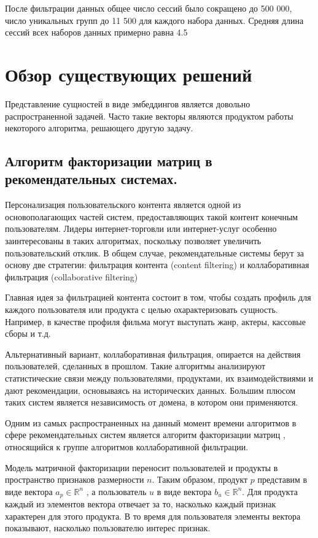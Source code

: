 \documentclass[times,specification,annotation]{itmo-student-thesis}
\begin{document}
После фильтрации данных общее число сессий было сокращено до 500 000, число уникальных групп до 11 500 для каждого набора данных. Средняя длина сессий всех наборов данных примерно равна 4.5

\section{Обзор существующих решений}

Представление сущностей в виде эмбеддингов является довольно распространенной задачей. Часто такие векторы являются продуктом работы некоторого алгоритма, решающего другую задачу. 

\subsection{Алгоритм факторизации матриц в рекомендательных системах.}\label{sec:als}

Персонализация пользовательского контента является одной из основополагающих частей систем, предоставляющих такой контент конечным пользователям. Лидеры интернет-торговли или интернет-услуг особенно заинтересованы в таких алгоритмах, поскольку позволяет увеличить пользовательский отклик.
В общем случае, рекомендательные системы берут за основу две стратегии: фильтрация контента (content filtering) и коллаборативная фильтрация (collaborative filtering)
  
Главная идея за фильтрацией контента состоит в том, чтобы создать профиль для каждого пользователя или продукта с целью охарактеризовать сущность. Например, в качестве профиля фильма могут выступать жанр, актеры, кассовые сборы и т.д.

Альтернативный вариант, коллаборативная фильтрация, опирается на действия пользователей, сделанных в прошлом. Такие алгоритмы анализируют статистические связи между пользователями, продуктами, их взаимодействиями и дают рекомендации, основываясь на исторических данных.  Большим плюсом таких систем является независимость от домена, в котором они применяются.

Одним из самых распространенных на данный момент времени алгоритмов в сфере рекомендательных систем является алгоритм факторизации матриц \cite{koren2009}, относящийся к группе алгоритмов коллаборативной фильтрации.

Модель матричной факторизации переносит пользователей и продукты в пространство признаков размерности $n$. Таким образом, продукт $p$ представим в виде вектора $a_{p} \in \mathbb{R}^n$ , а пользователь $u$ в виде вектора $b_{u} \in \mathbb{R}^n$. Для продукта каждый из элементов вектора отвечает за то, насколько каждый признак характерен для  этого продукта. В то время для пользователя элементы вектора показывают, насколько пользователю интерес признак.
\end{document}
